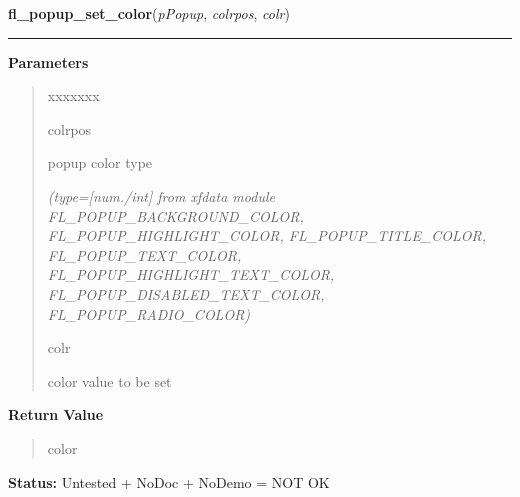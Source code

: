 \hspace{.8\funcindent}\begin{boxedminipage}{\funcwidth}

    \raggedright \textbf{fl\_popup\_set\_color}(\textit{pPopup}, \textit{colrpos}, \textit{colr})

    \vspace{-1.5ex}

    \rule{\textwidth}{0.5\fboxrule}
\setlength{\parskip}{2ex}
\setlength{\parskip}{1ex}
      \textbf{Parameters}
      \vspace{-1ex}

      \begin{quote}
        \begin{Ventry}{xxxxxxx}

          \item[colrpos]

          popup color type

            {\it (type=[num./int] from xfdata module FL\_POPUP\_BACKGROUND\_COLOR, 
FL\_POPUP\_HIGHLIGHT\_COLOR, FL\_POPUP\_TITLE\_COLOR, 
FL\_POPUP\_TEXT\_COLOR, FL\_POPUP\_HIGHLIGHT\_TEXT\_COLOR, 
FL\_POPUP\_DISABLED\_TEXT\_COLOR, FL\_POPUP\_RADIO\_COLOR)}

          \item[colr]

          color value to be set

        \end{Ventry}

      \end{quote}

      \textbf{Return Value}
    \vspace{-1ex}

      \begin{quote}
      color

      \end{quote}

\textbf{Status:} Untested + NoDoc + NoDemo = NOT OK



    \end{boxedminipage}

    \label{xformslib:library:fl_popup_set_cursor}

    \vspace{0.5ex}

